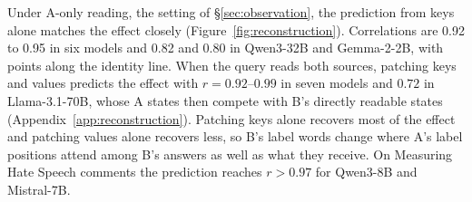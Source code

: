 \documentclass[11pt]{article}
\begin{document}
Under A-only reading, the setting of \S\ref{sec:observation}, the prediction from keys alone matches the effect closely (Figure~\ref{fig:reconstruction}).
Correlations are 0.92 to 0.95 in six models and 0.82 and 0.80 in Qwen3-32B and Gemma-2-2B, with points along the identity line.
When the query reads both sources, patching keys and values predicts the effect with $r=0.92$--$0.99$ in seven models and $0.72$ in Llama-3.1-70B, whose A states then compete with B's directly readable states (Appendix~\ref{app:reconstruction}).
Patching keys alone recovers most of the effect and patching values alone recovers less, so B's label words change where A's label positions attend among B's answers as well as what they receive.
On Measuring Hate Speech comments the prediction reaches $r>0.97$ for Qwen3-8B and Mistral-7B.

\begin{table}[t]
\centering\small
\setlength{\tabcolsep}{4pt}
\caption{The answer-to-label path in the native computation (controlled reviews, shared label words, A-only reading).
Effect: $\Delta$ (Eq.~\ref{eq:delta}, nats).
Reduction: decrease of this effect when A's label positions cannot attend to B's answers during formation.
Only the path: effect when A's demonstrations can attend to B's only through this path (zero without it).
All 95\% intervals exclude zero (Appendix~\ref{app:operation}).}
\label{tab:operation}
\end{table}
\end{document}
